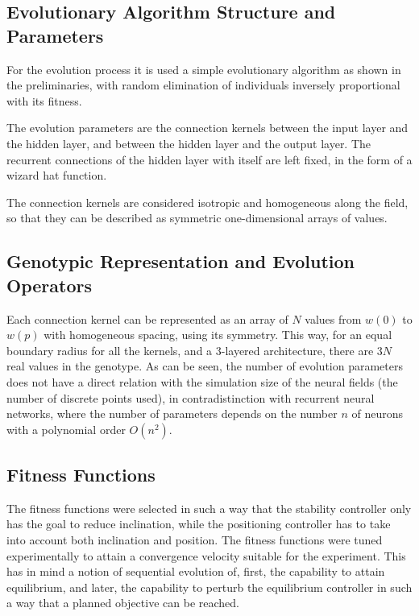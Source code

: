 \subsection{Evolutionary Algorithm Structure and Parameters}
For the evolution process it is used a simple evolutionary algorithm
as shown in the preliminaries, with random elimination of individuals
inversely proportional with its fitness.


The evolution parameters are the connection kernels between the input
layer and the hidden layer, and between the hidden layer and the
output layer. The recurrent connections of the hidden layer with
itself are left fixed, in the form of a wizard hat function.

The connection kernels are considered isotropic and homogeneous along
the field, so that they can be described as symmetric one-dimensional
arrays of values. 

\subsection{Genotypic Representation and Evolution Operators}
Each connection kernel can be represented as an array of $N$ values from
$w(0)$ to $w(p)$ with homogeneous spacing, using its symmetry. This
way, for an equal boundary radius for all the kernels, and a 3-layered
architecture, there are $3N$ real values in the genotype. As can be
seen, the number of evolution parameters does not have a direct
relation with the simulation size of the neural fields (the number of
discrete points used), in contradistinction with recurrent neural
networks, where the number of parameters depends on the
number $n$ of neurons with a polynomial order $O(n^2)$.

\subsection{Fitness Functions}
The fitness functions were selected in such a way that the stability controller
only has the goal to reduce inclination, while the positioning
controller has to take into account both inclination and position. The
fitness functions were tuned experimentally to attain a convergence
velocity suitable for the experiment. This has in mind a notion of
sequential evolution of, first, the capability to attain equilibrium,
and later, the capability to perturb the equilibrium controller in
such a way that a planned objective can be reached. 

